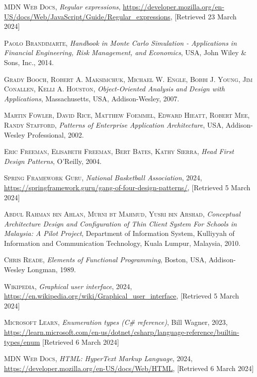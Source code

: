 \documentclass{thesis-ekf}
\theoremstyle{definition}
\theoremstyle{remark}
\begin{document}
\begin{thebibliography}{2}
\textsc{MDN Web Docs},
\emph{Regular expressions},
\url{https://developer.mozilla.org/en-US/docs/Web/JavaScript/Guide/Regular_expressions}, [Retrieved 23 March 2024]

\textsc{Paolo Brandimarte},
\emph{Handbook in Monte Carlo Simulation - Applications in Financial Engineering, Risk Management, and Economics},
USA, John Wiley \& Sons, Inc., 2014.









\textsc{Grady Booch, Robert A. Maksimchuk, Michael W. Engle, Bobbi J. Young, Jim Conallen, Kelli A. Houston},
\emph{Object-Oriented Analysis and Design with Applications}, 
Massachusetts, USA, Addison-Wesley, 2007.

\textsc{Martin Fowler, David Rice, Matthew Foemmel, Edward Hieatt, Robert Mee, Randy Stafford},
\emph{Patterns of Enterprise Application Architecture},
USA, Addison-Wesley Professional, 2002.

\textsc{Eric Freeman, Elisabeth Freeman, Bert Bates, Kathy Sierra},
\emph{Head First Design Patterns},
O'Reilly, 2004.

\textsc{Spring Framework Guru},
\emph{National Basketball Association}, 2024, 
\url{https://springframework.guru/gang-of-four-design-patterns/}, [Retrieved 5 March 2024]

\textsc{Abdul Rahman bin Ahlan, Murni bt Mahmud, Yusri bin Arshad},
\emph{Conceptual Architecture Design and Configuration of Thin Client System For Schools in Malaysia: A Pilot Project}, 
Department of Information System, Kulliyyah of Information and Communication Technology,
Kuala Lumpur, Malaysia, 2010.

\textsc{Chris Reade},
\emph{Elements of Functional Programming}, 
Boston, USA, Addison-Wesley Longman, 1989.

\textsc{Wikipedia},
\emph{Graphical user interface}, 2024,
\url{https://en.wikipedia.org/wiki/Graphical_user_interface}, [Retrieved 5 March 2024]

\textsc{Microsoft Learn},
\emph{Enumeration types (C\# reference)}, Bill Wagner, 2023,
\url{https://learn.microsoft.com/en-us/dotnet/csharp/language-reference/builtin-types/enum} [Retrieved 6 March 2024]

\textsc{MDN Web Docs},
\emph{HTML: HyperText Markup Language}, 2024,
\url{https://developer.mozilla.org/en-US/docs/Web/HTML}, [Retrieved 6 March 2024]


\end{thebibliography}
\end{document}
